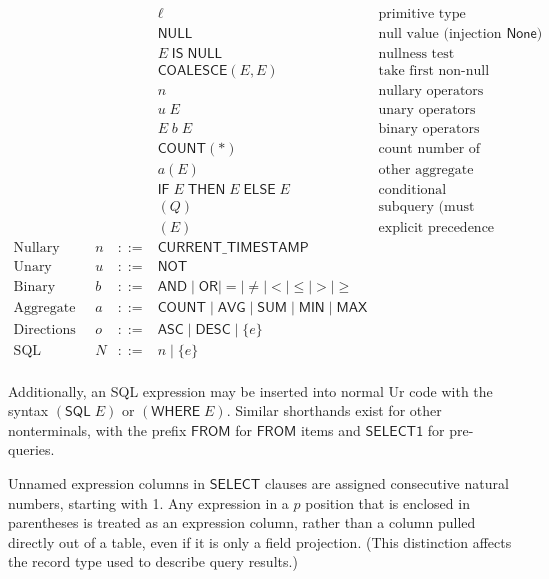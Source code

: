 \documentclass{article}
\newcommand{\mt}[1]{\mathsf{#1}}
\begin{document}
$$\begin{array}{rrcll}
  &&& \ell & \textrm{primitive type literals} \\
  &&& \mt{NULL} & \textrm{null value (injection of $\mt{None}$)} \\
  &&& E \; \mt{IS} \; \mt{NULL} & \textrm{nullness test} \\
  &&& \mt{COALESCE}(E, E) & \textrm{take first non-null value} \\
  &&& n & \textrm{nullary operators} \\
  &&& u \; E & \textrm{unary operators} \\
  &&& E \; b \; E & \textrm{binary operators} \\
  &&& \mt{COUNT}(\ast) & \textrm{count number of rows} \\
  &&& a(E) & \textrm{other aggregate function} \\
  &&& \mt{IF} \; E \; \mt{THEN} \; E \; \mt{ELSE} \; E & \textrm{conditional} \\
  &&& (Q) & \textrm{subquery (must return a single expression column)} \\
  &&& (E) & \textrm{explicit precedence} \\
  \textrm{Nullary operators} & n &::=& \mt{CURRENT\_TIMESTAMP} \\
  \textrm{Unary operators} & u &::=& \mt{NOT} \\
  \textrm{Binary operators} & b &::=& \mt{AND} \mid \mt{OR} \mid = \mid \neq \mid < \mid \leq \mid > \mid \geq \\
  \textrm{Aggregate functions} & a &::=& \mt{COUNT} \mid \mt{AVG} \mid \mt{SUM} \mid \mt{MIN} \mid \mt{MAX} \\
  \textrm{Directions} & o &::=& \mt{ASC} \mid \mt{DESC} \mid \{e\} \\
  \textrm{SQL integer} & N &::=& n \mid \{e\} \\
\end{array}$$

Additionally, an SQL expression may be inserted into normal Ur code with the syntax $(\mt{SQL} \; E)$ or $(\mt{WHERE} \; E)$.  Similar shorthands exist for other nonterminals, with the prefix $\mt{FROM}$ for $\mt{FROM}$ items and $\mt{SELECT1}$ for pre-queries.

Unnamed expression columns in $\mt{SELECT}$ clauses are assigned consecutive natural numbers, starting with 1.  Any expression in a $p$ position that is enclosed in parentheses is treated as an expression column, rather than a column pulled directly out of a table, even if it is only a field projection.  (This distinction affects the record type used to describe query results.)
\end{document}
